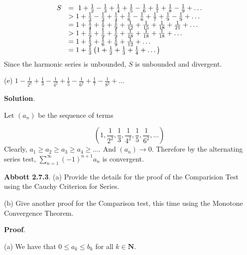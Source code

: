 \documentclass[10pt]{article}
\begin{document}
\begin{equation*}
\begin{array}{ c l }
S & =\ 1+\frac{1}{2} -\frac{1}{3} +\frac{1}{4} +\frac{1}{5} -\frac{1}{6} +\frac{1}{7} +\frac{1}{8} -\frac{1}{9} +\dotsc \\
 &  >1+\frac{1}{3} -\frac{1}{3} +\frac{1}{4} +\frac{1}{6} -\frac{1}{6} +\frac{1}{7} +\frac{1}{9} -\frac{1}{9} +\dotsc \\
 & =1+\frac{1}{4} +\frac{1}{7} +\frac{1}{9} +\frac{1}{12} +\frac{1}{15} +\frac{1}{18} +\frac{1}{21} +\dotsc \\
 &  >1+\frac{1}{9} +\frac{1}{9} +\frac{1}{9} +\frac{1}{18} +\frac{1}{18} +\frac{1}{18} +\dotsc \\
 & =1+\frac{1}{3} +\frac{1}{6} +\frac{1}{9} +\frac{1}{12} +\dotsc \\
 & =1+\frac{1}{3}\left( 1+\frac{1}{2} +\frac{1}{3} +\frac{1}{4} +\dotsc \right)
\end{array}
\end{equation*}
Since the harmonic series is unbounded, $\displaystyle S$ is unbounded and divergent.



(e) $\displaystyle 1-\frac{1}{2^{2}} +\frac{1}{3} -\frac{1}{4^{2}} +\frac{1}{5} -\frac{1}{6^{2}} +\frac{1}{7} -\frac{1}{8^{2}} +\dotsc $



\textbf{Solution}.

Let $\displaystyle ( a_{n})$ be the sequence of terms


\begin{equation*}
\left( 1,\frac{1}{2^{2}} ,\frac{1}{3} ,\frac{1}{4^{2}} ,\frac{1}{5} ,\frac{1}{6^{2}} ,\dotsc \right)
\end{equation*}
Clearly, $\displaystyle a_{1} \geq a_{2} \geq a_{3} \geq a_{4} \geq \dotsc $. And $\displaystyle ( a_{n})\rightarrow 0$. Therefore by the alternating series test, $\displaystyle \sum _{n=1}^{\infty }( -1)^{n+1} a_{n}$ is convergent.



\textbf{Abbott 2.7.3}. (a) Provide the details for the proof of the Comparision Test using the Cauchy Criterion for Series.



(b) Give another proof for the Comparison test, this time using the Monotone Convergence Theorem.



\textbf{Proof}.



(a) We have that $\displaystyle 0\leq a_{k} \leq b_{k}$ for all $\displaystyle k\in \mathbf{N}$.
\end{document}
